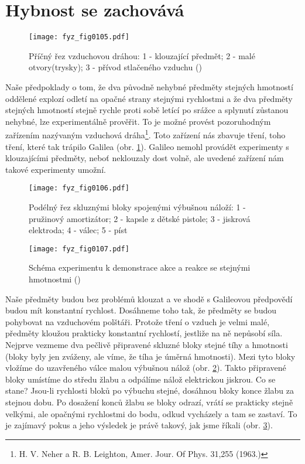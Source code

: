   \section{Hybnost se zachovává}
    
    \begin{figure}[ht!]  %
      \centering
      \texttt{[image: fyz\_fig0105.pdf]}
      \caption{Příčný řez vzduchovou dráhou: 1 - klouzající předmět; 2 - malé otvory(trysky); 3 -  
               přívod stlačeného vzduchu (\cite[s.~143]{Feynman01})}
      \label{fyz:fig0105}
    \end{figure}
    Naše předpoklady o tom, že dva původně nehybné předměty stejných hmotností oddělené explozí 
    odletí na opačné strany stejnými rychlostmi a že dva předměty stejných hmotností stejně rychle 
    proti sobě letící po srážce a splynutí zůstanou nehybné, lze experimentálně prověřit. To je 
    možné provést pozoruhodným zařízením nazývaným vzduchová dráha\footnote{H. V. Neher a R. B. 
    Leighton, Amer. Jour. Of Phys. 31,255 (1963.)}. Toto zařízení nás zbavuje tření, toho tření, 
    které tak trápilo Galilea (obr. \ref{fyz:fig0105}). Galileo nemohl provádět experimenty s 
    klouzajícími předměty, neboť neklouzaly dost volně, ale uvedené zařízení nám takové experimenty 
    umožní.

    \begin{figure}[ht!]  %
      \centering
      \texttt{[image: fyz\_fig0106.pdf]}
      \caption{Podélný řez skluznými bloky spojenými výbušnou náloží: 1 - pružinový amortizátor; 2 - kapsle 
               z dětské pistole; 3 - jiskrová elektroda; 4 - válec; 5 - píst      
                \cite[s.~144]{Feynman01}}
       \label{fyz:fig0106}     
    \end{figure}

    \begin{figure}[ht!]  %
      \centering
      \texttt{[image: fyz\_fig0107.pdf]}
      \caption{Schéma experimentu k demonstrace akce a reakce se stejnými hmotnostmi  
               (\cite[s.~144]{Feynman01})}
      \label{fyz:fig0107}
    \end{figure}
    Naše předměty budou bez problémů klouzat a ve shodě s Galileovou předpovědí budou mít 
    konstantní rychlost. Dosáhneme toho tak, že předměty se budou pohybovat na vzduchovém polštáři. 
    Protože tření o vzduch je velmi malé, předměty kloužou prakticky konstantní rychlostí, jestliže 
    na ně nepůsobí síla. Nejprve vezmeme dva pečlivě připravené skluzné bloky stejné tíhy a 
    hmotnosti (bloky byly jen zváženy, ale víme, že tíha je úměrná hmotnosti). Mezi tyto bloky 
    vložíme do uzavřeného válce malou výbušnou nálož (obr. \ref{fyz:fig0106}). Takto připravené 
    bloky umístíme do středu žlabu a odpálíme nálož elektrickou jiskrou. Co se stane? Jsou-li 
    rychlosti bloků po výbuchu stejné, dosáhnou bloky konce žlabu za stejnou dobu. Po dosažení 
    konců žlabu se bloky odrazí, vrátí se prakticky stejně velkými, ale opačnými rychlostmi 
    do bodu, odkud vycházely a tam se zastaví. To je zajímavý pokus a jeho výsledek je právě 
    takový, jak jsme říkali (obr. \ref{fyz:fig0107}).


